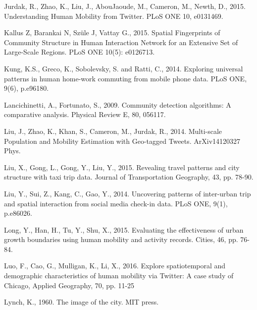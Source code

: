 \documentclass[]{tGIS2e}
\begin{document}
\begin{thebibliography}{9}
Jurdak, R., Zhao, K., Liu, J., AbouJaoude, M., Cameron, M., Newth, D., 2015. Understanding Human Mobility from Twitter. PLoS ONE 10, e0131469.

Kallus Z, Barankai N, Szüle J, Vattay G., 2015. Spatial Fingerprints of Community Structure in Human Interaction Network for an Extensive Set of Large-Scale Regions. PLoS ONE 10(5): e0126713. 

Kung, K.S., Greco, K., Sobolevsky, S. and Ratti, C., 2014. Exploring universal patterns in human home-work commuting from mobile phone data. PLoS ONE, 9(6), p.e96180.

Lancichinetti, A., Fortunato, S., 2009. Community detection algorithms: A comparative analysis. Physical Review E, 80, 056117.

Liu, J., Zhao, K., Khan, S., Cameron, M., Jurdak, R., 2014. Multi-scale Population and Mobility Estimation with Geo-tagged Tweets. ArXiv14120327 Phys.

Liu, X., Gong, L., Gong, Y., Liu, Y., 2015. Revealing travel patterns and city structure with taxi trip data. Journal of Transportation Geography, 43, pp. 78-90.

Liu, Y., Sui, Z., Kang, C., Gao, Y., 2014. Uncovering patterns of inter-urban trip and spatial interaction from social media check-in data. PLoS ONE, 9(1), p.e86026.

Long, Y., Han, H., Tu, Y., Shu, X., 2015. Evaluating the effectiveness of urban growth boundaries using human mobility and activity records. Cities, 46, pp. 76-84.

Luo, F., Cao, G., Mulligan, K., Li, X., 2016. Explore spatiotemporal and demographic characteristics of human mobility via Twitter: A case study of Chicago, Applied Geography, 70, pp. 11-25

Lynch, K., 1960. The image of the city. MIT press.


\end{thebibliography}
\end{document}
